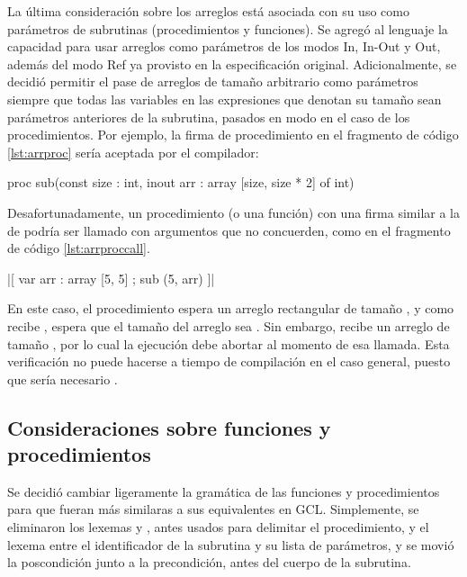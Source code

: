 La última consideración sobre los arreglos está asociada con su uso como
parámetros de subrutinas (procedimientos y funciones). Se agregó al lenguaje la
capacidad para usar arreglos como parámetros de los modos In, In-Out y Out,
además del modo Ref ya provisto en la especificación original. Adicionalmente,
se decidió permitir el pase de arreglos de tamaño arbitrario como parámetros
siempre que todas las variables en las expresiones que denotan su tamaño sean
parámetros anteriores de la subrutina, pasados en modo  en el caso
de los procedimientos. Por ejemplo, la firma de procedimiento en el fragmento de código \ref{lst:arrproc} sería
aceptada por el compilador:

\begin{gracielacode}[caption=Firma de procedimiento con parámetro de tipo arreglo, label=lst:arrproc]
proc sub(const size : int, inout arr : array [size, size * 2] of int)
\end{gracielacode}

Desafortunadamente, un procedimiento (o una función) con una firma similar a la
de  podría ser llamado con argumentos que no concuerden, como en el
fragmento de código \ref{lst:arrproccall}.

\begin{gracielacode}[caption=Llamada a procedimiento con argumento de tipo arreglo, label=lst:arrproccall]
|[ var arr : array [5, 5]
;  sub (5, arr)
]|
\end{gracielacode}

En este caso, el procedimiento  espera un arreglo rectangular de
tamaño , y como recibe , espera que
el tamaño del arreglo sea \ingra{[5, 10]}. Sin embargo, recibe un arreglo de
tamaño \ingra{[5, 5]}, por lo cual la ejecución debe abortar al momento de esa
llamada. Esta verificación no puede hacerse a tiempo de compilación en el caso
general, puesto que sería necesario .

\subsection{Consideraciones sobre funciones y procedimientos}

Se decidió cambiar ligeramente la gramática de las funciones y procedimientos
para que fueran más similaras a sus equivalentes en GCL. Simplemente, se
eliminaron los lexemas  y , antes usados para
delimitar el procedimiento, y el lexema \ingra{:} entre el identificador de la
subrutina y su lista de parámetros, y se movió la poscondición junto a la
precondición, antes del cuerpo de la subrutina.

